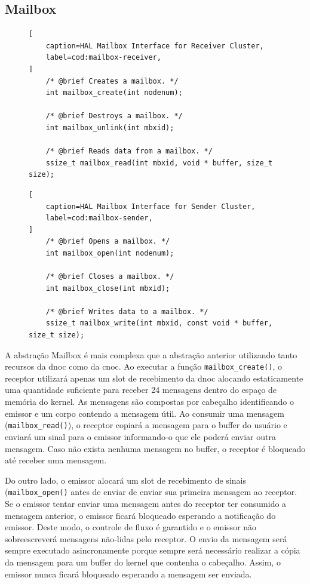 	\subsection{Mailbox}

\begin{figure}[t]
\begin{lstlisting}[
	caption=HAL Mailbox Interface for Receiver Cluster,
	label=cod:mailbox-receiver,
]
	/* @brief Creates a mailbox. */
	int mailbox_create(int nodenum);

	/* @brief Destroys a mailbox. */
	int mailbox_unlink(int mbxid);

	/* @brief Reads data from a mailbox. */
	ssize_t mailbox_read(int mbxid, void * buffer, size_t size);
\end{lstlisting}
\end{figure}

\begin{figure}[t]
\begin{lstlisting}[
	caption=HAL Mailbox Interface for Sender Cluster,
	label=cod:mailbox-sender,
]
	/* @brief Opens a mailbox. */
	int mailbox_open(int nodenum);

	/* @brief Closes a mailbox. */
	int mailbox_close(int mbxid);

	/* @brief Writes data to a mailbox. */
	ssize_t mailbox_write(int mbxid, const void * buffer, size_t size);
\end{lstlisting}
\end{figure}

		A abstração Mailbox é mais complexa que a abstração anterior utilizando
		tanto recursos da dnoc como da cnoc.
		Ao executar a função \texttt{mailbox\_create()}, o receptor utilizará
		apenas um slot de recebimento da dnoc alocando estaticamente uma
		quantidade suficiente para receber 24 mensagens dentro do espaço
		de memória do kernel.
		As mensagens são compostas por cabeçalho identificando o emissor
		e um corpo contendo a mensagem útil.
		Ao consumir uma mensagem (\texttt{mailbox\_read()}), o receptor copiará
		a mensagem para o buffer do usuário e enviará um sinal para o emissor
		informando-o que ele poderá enviar outra mensagem.
		Caso não exista nenhuma mensagem no buffer, o receptor é bloqueado
		até receber uma mensagem.

		Do outro lado, o emissor alocará um slot de recebimento de sinais
		(\texttt{mailbox\_open()} antes de enviar de enviar sua primeira mensagem ao receptor.
		Se o emissor tentar enviar uma mensagem antes do receptor ter consumido
		a mensagem anterior, o emissor ficará bloqueado esperando a notificação
		do emissor.
		Deste modo, o controle de fluxo é garantido e o emissor não
		sobreescreverá mensagens não-lidas pelo receptor.
		O envio da mensagem será sempre executado asincronamente porque
		sempre será necessário realizar a cópia da mensagem para um
		buffer do kernel que contenha o cabeçalho.
		Assim, o emissor nunca ficará bloqueado esperando a mensagem ser enviada.

